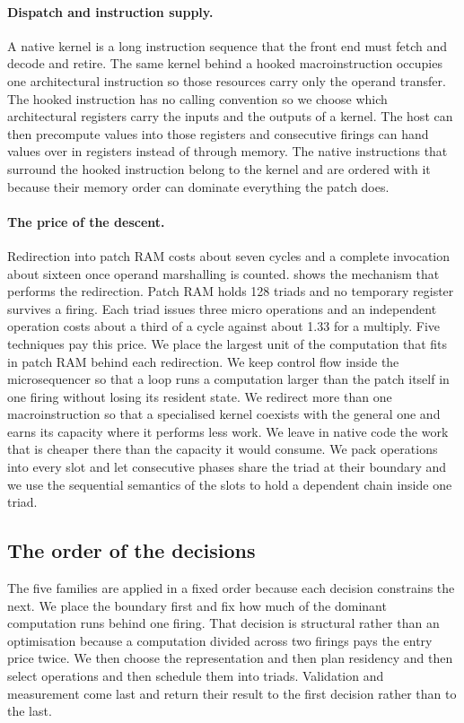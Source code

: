 \paragraph{Dispatch and instruction supply.}
A native kernel is a long instruction sequence that the front end must fetch and decode and retire.
The same kernel behind a hooked macroinstruction occupies one architectural instruction so those resources carry only the operand transfer.
The hooked instruction has no calling convention so we choose which architectural registers carry the inputs and the outputs of a kernel.
The host can then precompute values into those registers and consecutive firings can hand values over in registers instead of through memory.
The native instructions that surround the hooked instruction belong to the kernel and are ordered with it because their memory order can dominate everything the patch does.

\paragraph{The price of the descent.}
Redirection into patch RAM costs about seven cycles and a complete invocation about sixteen once operand marshalling is counted.
 shows the mechanism that performs the redirection.
Patch RAM holds 128 triads and no temporary register survives a firing.
Each triad issues three micro operations and an independent operation costs about a third of a cycle against about 1.33 for a multiply.
Five techniques pay this price.
We place the largest unit of the computation that fits in patch RAM behind each redirection.
We keep control flow inside the microsequencer so that a loop runs a computation larger than the patch itself in one firing without losing its resident state.
We redirect more than one macroinstruction so that a specialised kernel coexists with the general one and earns its capacity where it performs less work.
We leave in native code the work that is cheaper there than the capacity it would consume.
We pack operations into every slot and let consecutive phases share the triad at their boundary and we use the sequential semantics of the slots to hold a dependent chain inside one triad.

\subsection{The order of the decisions}
\label{sec:method-order}

The five families are applied in a fixed order because each decision constrains the next.
We place the boundary first and fix how much of the dominant computation runs behind one firing.
That decision is structural rather than an optimisation because a computation divided across two firings pays the entry price twice.
We then choose the representation and then plan residency and then select operations and then schedule them into triads.
Validation and measurement come last and return their result to the first decision rather than to the last.

